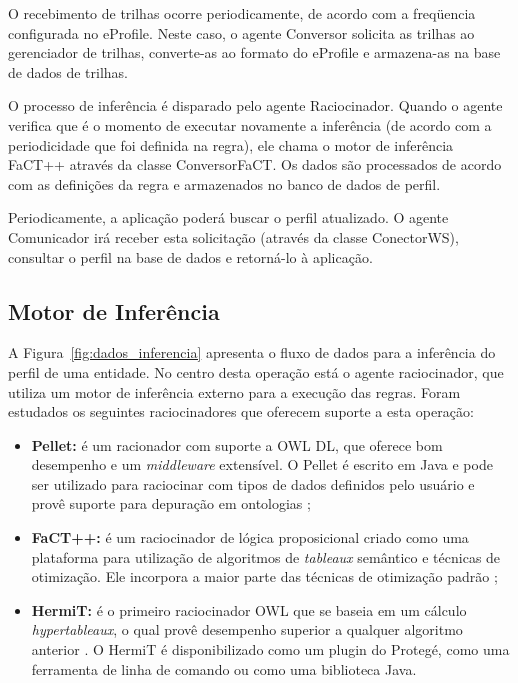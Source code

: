 O recebimento de trilhas ocorre periodicamente, de acordo com a freqüencia configurada no eProfile. Neste caso, o agente Conversor solicita as trilhas ao gerenciador de trilhas, converte-as ao formato do eProfile e armazena-as na base de dados de trilhas.

O processo de inferência é disparado pelo agente Raciocinador. Quando o agente verifica que é o momento de executar novamente a inferência (de acordo com a periodicidade que foi definida na regra), ele chama o motor de inferência FaCT++ através da classe ConversorFaCT. Os dados são processados de acordo com as definições da regra e armazenados no banco de dados de perfil.

Periodicamente, a aplicação poderá buscar o perfil atualizado. O agente Comunicador irá receber esta solicitação (através da classe ConectorWS), consultar o perfil na base de dados e retorná-lo à aplicação.


\subsection{Motor de Inferência}
\label{sec:motor_inferencia}

A Figura~\ref{fig:dados_inferencia} apresenta o fluxo de dados para a inferência do perfil de uma entidade. No centro desta operação está o agente raciocinador, que utiliza um motor de inferência externo para a execução das regras. Foram estudados os seguintes raciocinadores que oferecem suporte a esta operação:

\begin{itemize}

\item {\bf Pellet:} é um racionador com suporte a OWL DL, que oferece bom desempenho e um {\em middleware} extensível. O Pellet é escrito em Java e pode ser utilizado para raciocinar com tipos de dados definidos pelo usuário e provê suporte para depuração em ontologias \cite{sirin05};

\item {\bf FaCT++:} é um raciocinador de lógica proposicional criado como uma plataforma para utilização de algoritmos de {\em tableaux} semântico e técnicas de otimização. Ele incorpora a maior parte das técnicas de otimização padrão \cite{tsarkov06};

\item {\bf HermiT:} é o primeiro raciocinador OWL que se baseia em um cálculo {\em hypertableaux}, o qual provê desempenho superior a qualquer algoritmo anterior \cite{motik09}. O HermiT é disponibilizado como um plugin do Protegé, como uma ferramenta de linha de comando ou como uma biblioteca Java.

\end{itemize}

